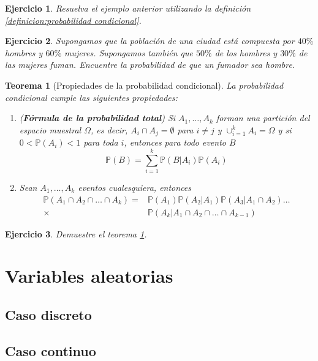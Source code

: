 \documentclass[11pt]{report}
\theoremstyle{break}
\newtheorem{teorema}{Teorema}[chapter]
\newtheorem{ejercicio}{Ejercicio}[chapter]
\theoremstyle{break}
\begin{document}
\begin{ejercicio}
Resuelva el ejemplo anterior utilizando la definición \ref{definicion:probabilidad condicional}.
\end{ejercicio}

\begin{ejercicio}
Supongamos que la población de una ciudad está compuesta por $40\%$ hombres y $60\%$ mujeres. Supongamos también que $50\%$ de los hombres y $30\%$ de las mujeres fuman. Encuentre la probabilidad de que un fumador sea hombre.
\end{ejercicio}

\begin{teorema}[Propiedades de la probabilidad condicional]
\label{teorema:propiedades probabilidad condicional}
La probabilidad condicional cumple las siguientes propiedades:
\begin{enumerate}[label=\alph*)]
\item (\textbf{Fórmula de la probabilidad total}) Si $A_1, \ldots, A_k$ forman una partición del espacio muestral $\Omega$, es decir, $A_i \cap A_j = \emptyset$ para $i \neq j$ y $\cup_{i=1}^{k}A_i = \Omega$ y si $0 < \mathbb{P}(A_i) < 1$ para toda $i$, entonces para todo evento $B$
$$
\mathbb{P}(B) = \sum_{i=1}^{k}\mathbb{P}(B|A_i)\mathbb{P}(A_i)
$$

\item Sean $A_1, \ldots, A_k$ eventos cualesquiera, entonces
\begin{align*}
\mathbb{P}(A_1 \cap A_2 \cap \ldots \cap A_k)  = & \mathbb{P}(A_1)\mathbb{P}(A_2|A_1)\mathbb{P}(A_3|A_1 \cap A_2)\ldots \\
 \times & \mathbb{P}(A_k|A_1 \cap A_2 \cap \ldots \cap A_{k-1})
\end{align*}
\end{enumerate}
\end{teorema}
\begin{ejercicio}
Demuestre el teorema \ref{teorema:propiedades probabilidad condicional}.
\end{ejercicio}


\chapter{Variables aleatorias}
\label{capitulo:variables aleatorias}

\section{Caso discreto}
\label{seccion:variables discretas}

\section{Caso continuo}
\label{seccion:variables continuas}
\end{document}
